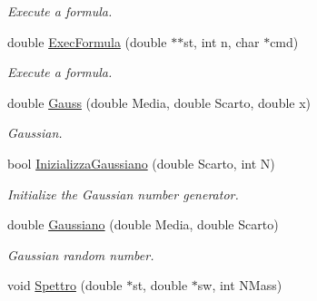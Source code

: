 \begin{DoxyCompactItemize}
\begin{DoxyCompactList}\small\item\em Execute a formula. \end{DoxyCompactList}\item 
double \hyperlink{classMatematica_a2d18b53fcf726b2a08d6c737033bde80}{Exec\+Formula} (double $\ast$$\ast$st, int n, char $\ast$cmd)\hypertarget{classMatematica_a2d18b53fcf726b2a08d6c737033bde80}{}\label{classMatematica_a2d18b53fcf726b2a08d6c737033bde80}

\begin{DoxyCompactList}\small\item\em Execute a formula. \end{DoxyCompactList}\item 
double \hyperlink{classMatematica_a21b0d93a1241a634ee8719c941619e4b}{Gauss} (double Media, double Scarto, double x)\hypertarget{classMatematica_a21b0d93a1241a634ee8719c941619e4b}{}\label{classMatematica_a21b0d93a1241a634ee8719c941619e4b}

\begin{DoxyCompactList}\small\item\em Gaussian. \end{DoxyCompactList}\item 
bool \hyperlink{classMatematica_af622f5a2f12722fd5ed7f8840fa730bd}{Inizializza\+Gaussiano} (double Scarto, int N)\hypertarget{classMatematica_af622f5a2f12722fd5ed7f8840fa730bd}{}\label{classMatematica_af622f5a2f12722fd5ed7f8840fa730bd}

\begin{DoxyCompactList}\small\item\em Initialize the Gaussian number generator. \end{DoxyCompactList}\item 
double \hyperlink{classMatematica_ad14013038c5963ed49ca1236e681db10}{Gaussiano} (double Media, double Scarto)
\begin{DoxyCompactList}\small\item\em Gaussian random number. \end{DoxyCompactList}\item 
void \hyperlink{classMatematica_abe4888052d3a0b30d84f2b4c7a523328}{Spettro} (double $\ast$st, double $\ast$sw, int N\+Mass)\hypertarget{classMatematica_abe4888052d3a0b30d84f2b4c7a523328}{}\label{classMatematica_abe4888052d3a0b30d84f2b4c7a523328}


\end{DoxyCompactItemize}
